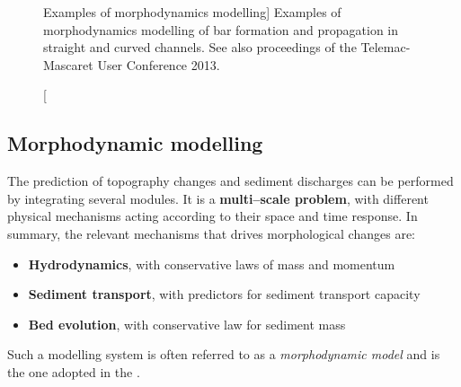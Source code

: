 \begin{figure}[H]%
\begin{center}
%
\hfil
%
%
\hfil
%

%
\hfil
\mbox{}
\end{center}
\caption
[Examples of morphodynamics modelling]
{Examples of morphodynamics modelling of bar formation and propagation in straight and curved channels. See also proceedings of the Telemac-Mascaret User Conference 2013.}
\label{fig:ExampleMultipleImages}
\end{figure}

\subsection{Morphodynamic modelling}
The prediction of topography changes and sediment discharges can be performed by integrating several modules. It is a {\bf multi--scale problem}, with different physical mechanisms acting according to their space and time response. In summary, the relevant mechanisms that drives morphological changes are:
\begin{itemize}
         \item {\bf Hydrodynamics}, with conservative laws of mass and momentum 
         \item {\bf Sediment transport}, with predictors for sediment transport capacity 
         \item {\bf Bed evolution}, with conservative law for sediment mass 
\end{itemize}
\noindent
Such a modelling system is often referred to as a \emph{morphodynamic model} and is the one adopted in the \telemacsystem{}.

